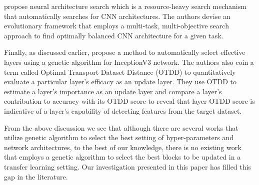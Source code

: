 \documentclass[a4paper,fleqn]{cas-sc}
\begin{document}
\citet{CaiLuo2021} propose neural architecture search which is a resource-heavy search mechanism that automatically searches for CNN architectures. %
The authors devise an evolutionary framework that employs a multi-task, multi-objective search approach to find optimally balanced CNN architecture for a given task. %

Finally, as discussed earlier, \citet{Nagae2022} propose a method to automatically select effective layers using a genetic algorithm for InceptionV3 network. The authors also coin a term called Optimal Transport Dataset Distance (OTDD) to quantitatively evaluate a particular layer's efficacy as an update layer. They use OTDD to estimate a layer's importance as an update layer and compare a layer's contribution to accuracy with its OTDD score to reveal that layer OTDD score is indicative of a layer's capability of detecting features from the target dataset. %

From the above discussion we see that although there are several works that utilize genetic algorithm to select the best setting of hyper-parameters and network architectures, to the best of our knowledge, there is no existing work that employs a genetic algorithm to select the best blocks to be updated in a transfer learning setting. Our  investigation presented in this paper has filled this gap in the literature.
\end{document}
